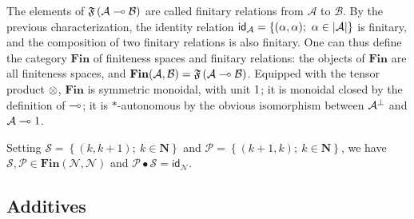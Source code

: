 The elements of
\(\mathfrak F\left({\mathcal A}\multimap{\mathcal B}\right)\) are called
finitary relations from \({\mathcal A}\) to \({\mathcal B}\). By the
previous characterization, the identity relation
\(\mathsf{id}_{{\mathcal A}} = \left\{(\alpha,\alpha);\  \alpha\in\left|{\mathcal A}\right|\right\}\)
is finitary, and the composition of two finitary relations is also
finitary. One can thus define the category \(\mathbf{Fin}\) of
finiteness spaces and finitary relations: the objects of
\(\mathbf{Fin}\) are all finiteness spaces, and
\(\mathbf{Fin}({\mathcal A},{\mathcal B})=\mathfrak F\left({\mathcal A}\multimap{\mathcal B}\right)\).
Equipped with the tensor product \(\otimes\), \(\mathbf{Fin}\) is
symmetric monoidal, with unit \(1\); it is monoidal closed by the
definition of \(\multimap\); it is \(*\)-autonomous by the obvious
isomorphism between \({\mathcal A}^\bot\) and \({\mathcal A}\multimap1\).

\begin{example}\label{example.-1}
Setting \(\mathcal{S}=\left\{(k,k+1);\  k\in{\mathbf N}\right\}\) and \(\mathcal{P}=\left\{(k+1,k);\  k\in{\mathbf N}\right\}\), we have \(\mathcal{S},\mathcal{P}\in\mathbf{Fin}({\mathcal N},{\mathcal N})\) and \(\mathcal{P}\bullet\mathcal{S}=\mathsf{id}_{{\mathcal N}}\).
\end{example}

\subsection{Additives}\label{additives}


